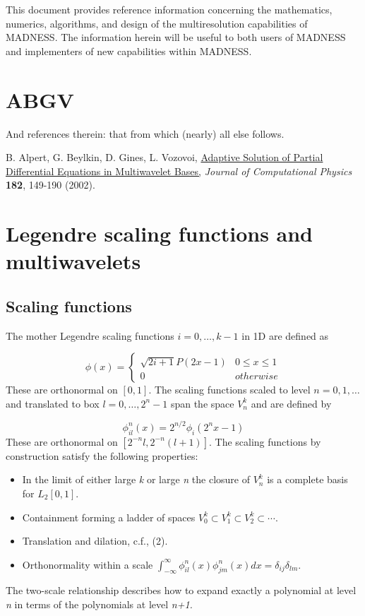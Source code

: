 \documentclass[letterpaper]{book}
\begin{document}
This document provides reference information concerning the mathematics, numerics, algorithms, and design of the
multiresolution capabilities of MADNESS. The information herein will be useful to both users of MADNESS and
implementers of new capabilities within MADNESS.

\section{ABGV}
And references therein: that from which (nearly) all else follows.

B. Alpert, G. Beylkin, D. Gines, L. Vozovoi, \href{http://math.nist.gov/~BAlpert/mwpde.pdf}{Adaptive Solution of Partial
Differential Equations in Multiwavelet Bases,} \textit{Journal of Computational Physics }\textbf{182}, 149-190 (2002). 

\section{Legendre scaling functions and multiwavelets}
\subsection{Scaling functions}
The mother Legendre scaling functions  $i=0,\ldots ,k-1$ in 1D are defined as

\begin{equation}
\phi (x)=\left\{\begin{matrix}\sqrt{2i+1}P(2x-1)&0\le x\le 1\\0&\mathrm{\mathit{otherwise}}\end{matrix}\right.
\end{equation}
These are orthonormal on  $[0,1]$. The scaling functions scaled to level  $n=0,1,\ldots $ and translated to box 
$l=0,\ldots ,2^{n}-1$ span the space  $V_{n}^{k}$ and are defined by

\begin{equation}\label{seq:refText1}
\phi _{il}^{n}(x)=2^{n/2}\phi _{i}(2^{n}x-1)
\end{equation}
These are orthonormal on  $[2^{-n}l,2^{-n}(l+1)]$. The scaling functions by construction satisfy the following
properties:

\begin{itemize}
\item In the limit of either large \textit{k }or large \textit{n }the closure of  $V_{n}^{k}$ is a complete basis for 
$L_{2}[0,1]$.
\item Containment forming a ladder of spaces  $V_{0}^{k}\subset V_{1}^{k}\subset V_{2}^{k}\subset \cdots $.
\item Translation and dilation, c.f., (2).
\item Orthonormality within a scale  $\int _{-\infty }^{\infty }{\phi _{il}^{n}(x)\phi _{jm}^{n}(x)\mathit{dx}}=\delta
_{ij}\delta _{lm}$.
\end{itemize}
The two-scale relationship describes how to expand exactly a polynomial at level \textit{n }in terms of the polynomials
at level \textit{n+1.}
\end{document}
